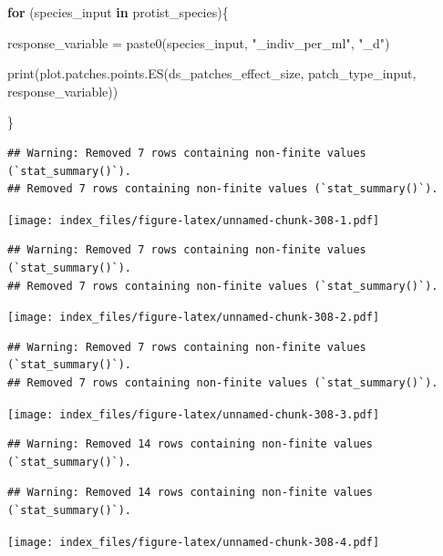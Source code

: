 \documentclass[
]{article}
\newenvironment{Shaded}{\begin{snugshade}}{\end{snugshade}}
\newcommand{\ControlFlowTok}[1]{\textcolor[rgb]{0.13,0.29,0.53}{\textbf{#1}}}
\newcommand{\FunctionTok}[1]{\textcolor[rgb]{0.00,0.00,0.00}{#1}}
\newcommand{\NormalTok}[1]{#1}
\newcommand{\OtherTok}[1]{\textcolor[rgb]{0.56,0.35,0.01}{#1}}
\newcommand{\StringTok}[1]{\textcolor[rgb]{0.31,0.60,0.02}{#1}}
\begin{document}
\begin{Shaded}
\begin{Highlighting}[]
\ControlFlowTok{for}\NormalTok{ (species\_input }\ControlFlowTok{in}\NormalTok{ protist\_species)\{}
  
\NormalTok{  response\_variable }\OtherTok{=} \FunctionTok{paste0}\NormalTok{(species\_input, }\StringTok{"\_indiv\_per\_ml"}\NormalTok{, }\StringTok{"\_d"}\NormalTok{)}
  
  \FunctionTok{print}\NormalTok{(}\FunctionTok{plot.patches.points.ES}\NormalTok{(ds\_patches\_effect\_size, patch\_type\_input,}
\NormalTok{                               response\_variable))}
  
\NormalTok{\}}
\end{Highlighting}
\end{Shaded}

\begin{verbatim}
## Warning: Removed 7 rows containing non-finite values (`stat_summary()`).
## Removed 7 rows containing non-finite values (`stat_summary()`).
\end{verbatim}

\texttt{[image: index\_files/figure-latex/unnamed-chunk-308-1.pdf]}

\begin{verbatim}
## Warning: Removed 7 rows containing non-finite values (`stat_summary()`).
## Removed 7 rows containing non-finite values (`stat_summary()`).
\end{verbatim}

\texttt{[image: index\_files/figure-latex/unnamed-chunk-308-2.pdf]}

\begin{verbatim}
## Warning: Removed 7 rows containing non-finite values (`stat_summary()`).
## Removed 7 rows containing non-finite values (`stat_summary()`).
\end{verbatim}

\texttt{[image: index\_files/figure-latex/unnamed-chunk-308-3.pdf]}

\begin{verbatim}
## Warning: Removed 14 rows containing non-finite values (`stat_summary()`).
\end{verbatim}

\begin{verbatim}
## Warning: Removed 14 rows containing non-finite values (`stat_summary()`).
\end{verbatim}

\texttt{[image: index\_files/figure-latex/unnamed-chunk-308-4.pdf]}
\end{document}
